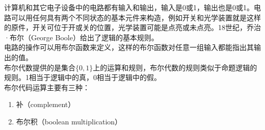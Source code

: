 计算机和其它电子设备中的电路都有输入和输出，输入是0或1，输出也是0或1。电路可以用任何具有两个不同状态的基本元件来构造，例如开关和光学装置就是这样的原件，开关可位于开或关的位置，光学装置可能是点亮或未点亮。18世纪，乔治·布尔（George Boole）给出了逻辑的基本规则。\\

电路的操作可以用布尔函数来定义，这样的布尔函数对任意一组输入都能指出其输出的值。\\

布尔代数提供的是集合$ \{0, 1\} $上的运算和规则，布尔代数的规则类似于命题逻辑的规则。1相当于逻辑中的真，0相当于逻辑中的假。\\

布尔代码运算主要有三种：

\begin{enumerate}
	\item 补（complement）
	      \begin{table}[H]
		      \centering
	      \end{table}

	\item 布尔积（boolean multiplication）
	      \begin{table}[H]
		      \centering
	      \end{table}


\end{enumerate}
